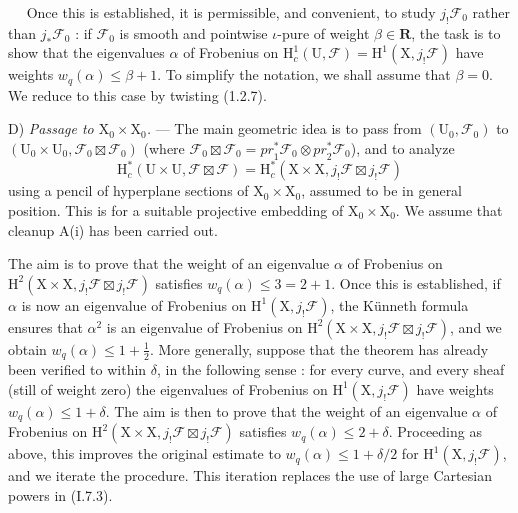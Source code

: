 \documentclass[11pt,leqno]{article}
\newcommand{\Page}[1]{\ifvmode\noindent\else\unskip\ \fi{\footnotesize\textcolor{gray}{[p.\,#1]}}\ \ignorespaces}
\begin{document}
\Page{140}
Once this is established, it is permissible, and convenient, to study \(j_!\mathscr{F}_0\) rather than \(j_*\mathscr{F}_0\) : if \(\mathscr{F}_0\) is smooth and pointwise \(\iota\)-pure of weight \(\beta\in\mathbf{R}\), the task is to show that the eigenvalues \(\alpha\) of Frobenius on \(\mathrm{H}_c^1(\mathrm{U},\mathscr{F})=\mathrm{H}^1(\mathrm{X},j_!\mathscr{F})\) have weights \(w_q(\alpha)\leq\beta+1\). To simplify the notation, we shall assume that \(\beta=0\). We reduce to this case by twisting (1.2.7).

D) \textit{Passage to \(\mathrm{X}_0\times\mathrm{X}_0\).} — The main geometric idea is to pass from \((\mathrm{U}_0,\mathscr{F}_0)\) to \((\mathrm{U}_0\times\mathrm{U}_0,\mathscr{F}_0\boxtimes\mathscr{F}_0)\) (where \(\mathscr{F}_0\boxtimes\mathscr{F}_0=\mathit{pr}_1^*\mathscr{F}_0\otimes\mathit{pr}_2^*\mathscr{F}_0\)), and to analyze
\[
\mathrm{H}_c^*(\mathrm{U}\times\mathrm{U},\mathscr{F}\boxtimes\mathscr{F})
=
\mathrm{H}_c^*(\mathrm{X}\times\mathrm{X},j_!\mathscr{F}\boxtimes j_!\mathscr{F})
\]
using a pencil of hyperplane sections of \(\mathrm{X}_0\times\mathrm{X}_0\), assumed to be in general position. This is for a suitable projective embedding of \(\mathrm{X}_0\times\mathrm{X}_0\). We assume that cleanup A(i) has been carried out.

The aim is to prove that the weight of an eigenvalue \(\alpha\) of Frobenius on \(\mathrm{H}^2(\mathrm{X}\times\mathrm{X},j_!\mathscr{F}\boxtimes j_!\mathscr{F})\) satisfies \(w_q(\alpha)\leq 3=2+1\). Once this is established, if \(\alpha\) is now an eigenvalue of Frobenius on \(\mathrm{H}^1(\mathrm{X},j_!\mathscr{F})\), the Künneth formula ensures that \(\alpha^2\) is an eigenvalue of Frobenius on \(\mathrm{H}^2(\mathrm{X}\times\mathrm{X},j_!\mathscr{F}\boxtimes j_!\mathscr{F})\), and we obtain \(w_q(\alpha)\leq 1+\frac{1}{2}\). More generally, suppose that the theorem has already been verified to within \(\delta\), in the following sense : for every curve, and every sheaf (still of weight zero) the eigenvalues of Frobenius on \(\mathrm{H}^1(\mathrm{X},j_!\mathscr{F})\) have weights \(w_q(\alpha)\leq 1+\delta\). The aim is then to prove that the weight of an eigenvalue \(\alpha\) of Frobenius on \(\mathrm{H}^2(\mathrm{X}\times\mathrm{X},j_!\mathscr{F}\boxtimes j_!\mathscr{F})\) satisfies \(w_q(\alpha)\leq 2+\delta\). Proceeding as above, this improves the original estimate to \(w_q(\alpha)\leq 1+\delta/2\) for \(\mathrm{H}^1(\mathrm{X},j_!\mathscr{F})\), and we iterate the procedure. This iteration replaces the use of large Cartesian powers in (I.7.3).
\end{document}
